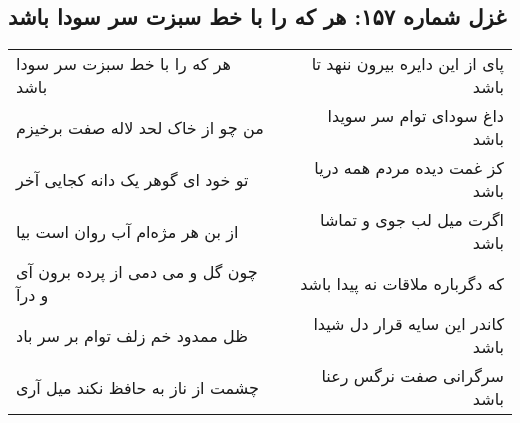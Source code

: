\begin{center}
\section*{غزل شماره ۱۵۷: هر که را با خط سبزت سر سودا باشد}
\label{sec:sh157}
\begin{longtable}{l p{0.5cm} r}
هر که را با خط سبزت سر سودا باشد
&&
پای از این دایره بیرون ننهد تا باشد
\\
من چو از خاک لحد لاله صفت برخیزم
&&
داغ سودای توام سر سویدا باشد
\\
تو خود ای گوهر یک دانه کجایی آخر
&&
کز غمت دیده مردم همه دریا باشد
\\
از بن هر مژه‌ام آب روان است بیا
&&
اگرت میل لب جوی و تماشا باشد
\\
چون گل و می دمی از پرده برون آی و درآ
&&
که دگرباره ملاقات نه پیدا باشد
\\
ظل ممدود خم زلف توام بر سر باد
&&
کاندر این سایه قرار دل شیدا باشد
\\
چشمت از ناز به حافظ نکند میل آری
&&
سرگرانی صفت نرگس رعنا باشد
\\
\end{longtable}
\end{center}
